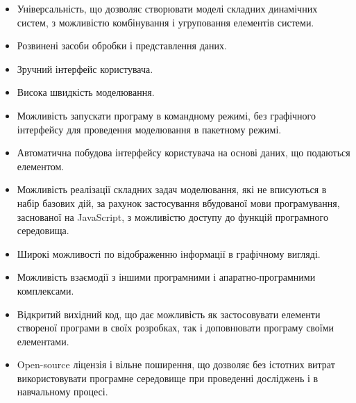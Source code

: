 \begin{itemize}

  \item
    Універсальність, що дозволяє створювати моделі складних
    динамічних систем, з можливістю комбінування і угруповання
    елементів системи.

  \item
    Розвинені засоби обробки і представлення даних.

  \item
    Зручний інтерфейс користувача.

  \item
    Висока швидкість моделювання.

  \item
    Можливість запускати програму в командному режимі, без
    графічного інтерфейсу для проведення моделювання в пакетному
    режимі.

  \item
    Автоматична побудова інтерфейсу користувача на основі даних,
    що подаються елементом.

  \item
    Можливість реалізації складних задач моделювання, які не
    вписуються в набір базових дій, за рахунок застосування
    вбудованої мови програмування, заснованої на JavaScript, з
    можливістю доступу до функцій програмного середовища.

  \item
    Широкі можливості по відображенню інформації в графічному
    вигляді.

  \item
    Можливість взаємодії з іншими програмними і
    апаратно-програмними комплексами.


  \item
    Відкритий вихідний код, що дає можливість як застосовувати
    елементи створеної програми в своїх розробках, так і доповнювати
    програму своїми елементами.


  \item
    Open-source ліцензія і вільне поширення, що дозволяє без істотних
    витрат використовувати програмне середовище при проведенні
    досліджень і в навчальному процесі.

\end{itemize}




